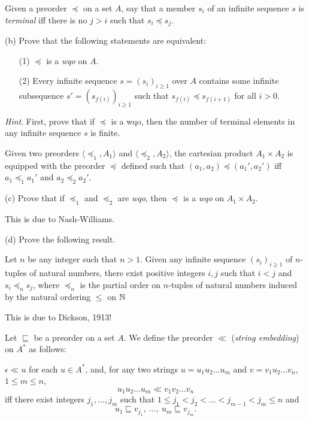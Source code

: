 \documentclass[12pt]{article}
\def\fseq#1#2{(#1_{#2})_{#2\geq 1}}
\def\fsseq#1#2#3{(#1_{#3(#2)})_{#2\geq 1}}
\def\qleq{\sqsubseteq}
\begin{document}
\medskip
Given a preorder $\preceq$ on a set $A$, 
say that a member $s_{i}$ of an infinite sequence $s$ is {\it terminal\/} iff
there is no $j>i$ such that $s_{i}\preceq s_{j}$. 

\medskip
(b) 
Prove that the following statements 
are equivalent:
\begin{enumerate}
\item[(1)]
$\preceq$ is a {\it wqo\/} on $A$.
\medskip
\item[(2)]
Every infinite sequence $s=\fseq{s}{i}$ over $A$ 
contains some infinite subsequence
$s'=\fsseq{s}{i}{f}$ such that $s_{f(i)}\preceq s_{f(i+1)}$ for all $i>0$.
\end{enumerate}

\medskip\noindent
{\it Hint\/}. First, prove that if $\preceq$ is a wqo, then
the number of terminal elements in any infinite  sequence $s$ is finite. 

\medskip
Given two preorders $\langle \preceq_{1},A_{1}\rangle$
and $\langle \preceq_{2},A_{2}\rangle$, the cartesian product
$A_{1}\times A_{2}$ is equipped with the preorder $\preceq$ defined
such that $(a_{1},a_{2})\preceq (a_{1}',a_{2}')$ iff
$a_{1} \preceq_{1} a_{1}'$ and $a_{2} \preceq_{2} a_{2}'$.

\medskip
(c) 
Prove that
if  $\preceq_{1}$ and $\preceq_{2}$ are {\it wqo\/}, 
then  $\preceq$ is a {\it wqo\/} on $A_{1}\times A_{2}$.

\remark
This is due to Nash-Williams.

\medskip
(d) 
Prove the following result.

\medskip
Let $n$ be any  integer such that $n>1$.
Given any infinite sequence $\fseq{s}{i}$ of $n$-tuples of
natural numbers, there exist positive integers $i, j$ such that
$i<j$ and $s_{i}\preceq_{n} s_{j}$, where $\preceq_{n}$ is the
partial order on $n$-tuples of natural numbers
induced by the natural ordering $\leq$ on $\mathbb{N}$

\remark
This is due to 
Dickson, 1913!

\medskip
Let $\qleq$ be a preorder on a set $A$. We define the 
preorder $\ll$ ({\it string embedding\/})
on $A^{*}$ as follows:

\medskip\noindent
$\epsilon \ll u$ for each $u\in A^{*}$, and,
for any two strings $u=u_{1}u_{2}\ldots u_{m}$ and
$v=v_{1}u_{2}\ldots v_{n}$, $1\leq m\leq n$, 
$$u_{1}u_{2}\ldots u_{m} \ll v_{1}v_{2}\ldots v_{n}$$
iff there exist  integers $j_{1},\ldots,j_{m}$ such that
$1\leq j_{1} < j_{2} < \ldots < j_{m-1} < j_{m} \leq n$ and
$$u_{1} \qleq v_{j_{1}},\ \ldots,\ u_{m} \qleq v_{j_{m}}.$$
\end{document}
